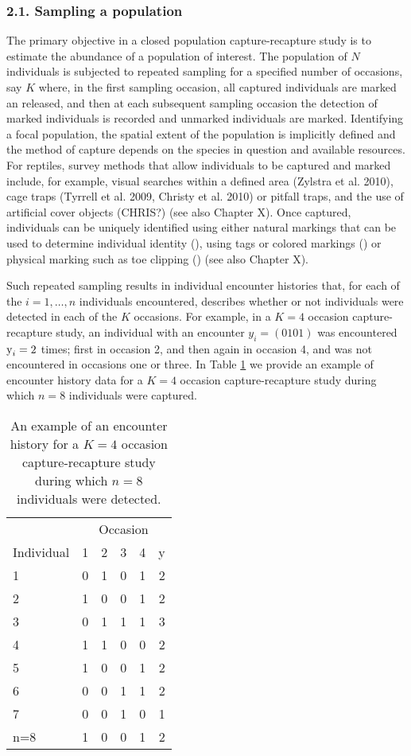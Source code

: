 \documentclass{book}
\begin{document}
\subsubsection*{2.1. Sampling a population}

The primary objective in a closed population capture-recapture study is
to estimate the abundance of a population of interest. The population
of $N$ individuals is subjected to repeated sampling for a specified
number of occasions, say $K$ where, in the first sampling occasion,
all captured individuals are marked an released, and then at each
subsequent sampling occasion the detection of marked individuals is
recorded and unmarked individuals are marked. Identifying a focal
population, the spatial extent of the population is implicitly defined
and the method of capture depends on the species in question and
available resources. For reptiles, survey methods that allow
individuals to be captured and marked include, for example, visual
searches within a defined area (Zylstra et al. 2010),
cage traps (Tyrrell et al. 2009, Christy et al. 2010) 
or pitfall traps, and the use of
artificial cover objects (CHRIS?) (see also Chapter X). Once captured,
individuals can be uniquely identified using either natural markings
that can be used to determine individual identity (), using tags or
colored markings () or physical marking such as toe clipping () (see
also Chapter X).

Such repeated sampling results in individual encounter histories that,
for each of the $i=1,\ldots,n$ individuals encountered, describes
whether or not individuals were detected in each of the $K$
occasions. For example, in a $K = 4$ occasion capture-recapture study,
an individual with an encounter $y_i = (0 1 0 1)$ was encountered
$\hbox{y}_i = 2$ times; first in occasion 2, and then again in
occasion 4, and was not encountered in occasions one or three. In
Table \ref{enchist} we provide an example of encounter history data
for a $K=4$ occasion capture-recapture study during which $n=8$
individuals were captured.

\begin{table}[h]
  \centering
  \caption{An example of an encounter history for a $K = 4$ occasion capture-recapture study during which $n=8$ individuals were detected.}
  \label{enchist}
 \begin{tabular}{lccccr}
 \hline
    &\multicolumn{5}{c}{Occasion} \\
  Individual & 1 & 2 & 3 & 4 & y\\
 \hline
  1   & 0 & 1 & 0 & 1 & 2 \\
  2   & 1 & 0 & 0 & 1 & 2 \\
  3   & 0 & 1 & 1 & 1 & 3 \\
  4   & 1 & 1 & 0 & 0 & 2 \\
  5   & 1 & 0 & 0 & 1 & 2 \\
  6   & 0 & 0 & 1 & 1 & 2 \\
  7   & 0 & 0 & 1 & 0 & 1 \\
  n=8 & 1 & 0 & 0 & 1 & 2 \\
 \hline
 \end{tabular}
\end{table}
\end{document}
